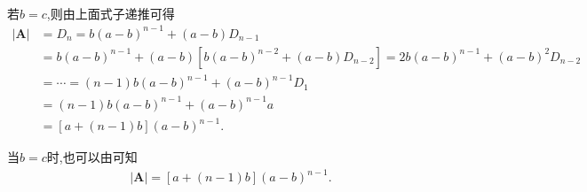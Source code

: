 \documentclass[../../main.tex]{subfiles}
\begin{document}
\begin{solution}
\begin{align*}
\nonumber
\end{align*}
若$b=c$,则由上面式子递推可得
\begin{align*}
\left| \boldsymbol{A} \right|&=D_n=b\left( a-b \right) ^{n-1}+\left( a-b \right) D_{n-1}
\\
&=b\left( a-b \right) ^{n-1}+\left( a-b \right) \left[ b\left( a-b \right) ^{n-2}+\left( a-b \right) D_{n-2} \right] 
=2b\left( a-b \right) ^{n-1}+\left( a-b \right) ^2D_{n-2}
\\
&=\cdots =\left( n-1 \right) b\left( a-b \right) ^{n-1}+\left( a-b \right) ^{n-1}D_1
\\
&=\left( n-1 \right) b\left( a-b \right) ^{n-1}+\left( a-b \right) ^{n-1}a
\\
&=\left[ a+\left( n-1 \right) b \right] \left( a-b \right) ^{n-1}.
\end{align*}

当$b=c$时,也可以由可知
\begin{align*}
|\boldsymbol{A}|=\left[ a+\left( n-1 \right) b \right] \left( a-b \right) ^{n-1}.
\nonumber
\end{align*}

\end{solution}
\end{document}
